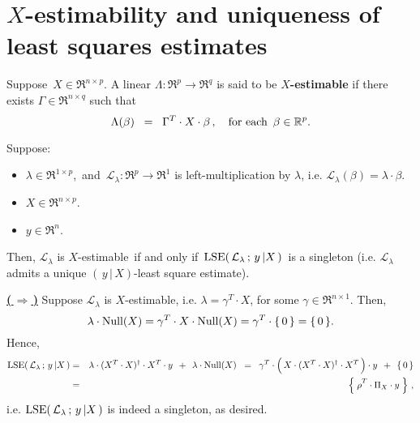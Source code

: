 

\section{$X$-estimability and uniqueness of least squares estimates}
\setcounter{theorem}{0}
\setcounter{equation}{0}

\renewcommand{\theenumi}{\roman{enumi}}
\renewcommand{\labelenumi}{\textnormal{(\theenumi)}$\;\;$}


\begin{definition}
\mbox{}\vskip 0.1cm\noindent
Suppose \,$X \in \Re^{n \times p}$.
A linear $\Lambda : \Re^{p} \longrightarrow \Re^{q}$ is said to be \textbf{$X$-estimable}
if there exists $\Gamma \in \Re^{n \times q}$ such that
\begin{equation*}
\Lambda(\beta) \;\; =\;\; \Gamma^{T} \cdot X \cdot \beta\,,
\quad
\textnormal{for each \,$\beta \in \Re^{p}$}.
\end{equation*}
\end{definition}

\begin{proposition}
\label{VectorEstimabilityImpliesUniqueLSE}
\mbox{}\vskip 0.1cm\noindent
Suppose:
\begin{itemize}
\item
	$\lambda \in \Re^{1 \times p}$,\,
	and
	\,$\mathcal{L}_{\lambda} : \Re^{p} \longrightarrow \Re^{1}$ is left-multiplication by $\lambda$,
	i.e. $\mathcal{L}_{\lambda}(\beta) = \lambda \cdot \beta$.
\item
	$X \in \Re^{n \times p}$.
\item
	$y \in \Re^{n}$.
\end{itemize}
Then,
	$\mathcal{L}_{\lambda}$ is $X$-estimable
	\,if and only if\,
	$\lse\!\left(\,\mathcal{L}_{\lambda} \,;\, y\,\vert X\,\right)$\,
	is a singleton (i.e. $\mathcal{L}_{\lambda}$ admits a unique $(\,y\,\vert\,X)$-least square estimate).
\end{proposition}
\proof
\vskip 0.2cm\noindent
\underline{\textbf{(\,$\Longrightarrow$\,)}}\quad
Suppose $\mathcal{L}_{\lambda}$ is $X$-estimable, i.e. $\lambda = \gamma^{T} \cdot X$,
for some $\gamma \in \Re^{n \times 1}$.
Then,
\begin{equation*}
\lambda\cdot\Null(X) = \gamma^{T} \cdot X \cdot \Null(X) = \gamma^{T} \cdot \{\,0\,\} = \{\,0\,\}.
\end{equation*}
Hence,
\begin{eqnarray*}
\lse\!\left(\,\mathcal{L}_{\lambda} \,;\, y\,\vert X\,\right)
&=&
	\lambda \cdot (X^{T} \cdot X)^{\dagger} \cdot X^{T} \cdot y \;\, + \;\, \lambda \cdot \Null(X)
\;\;=\;\;
	\gamma^{T} \cdot \left(\,\overset{{\color{white}.}}{X} \cdot (X^{T} \cdot X)^{\dagger} \cdot X^{T}\,\right) \cdot y \;\, + \;\, \{\,0\,\}
\\
&=&
	\left\{\; \overset{{\color{white}.}}{\rho}^{T} \cdot \Pi_{X} \cdot y \;\right\}\,,
\end{eqnarray*}
i.e. $\lse\!\left(\,\mathcal{L}_{\lambda} \,;\, y\,\vert X\,\right)$ is indeed a singleton, as desired.

